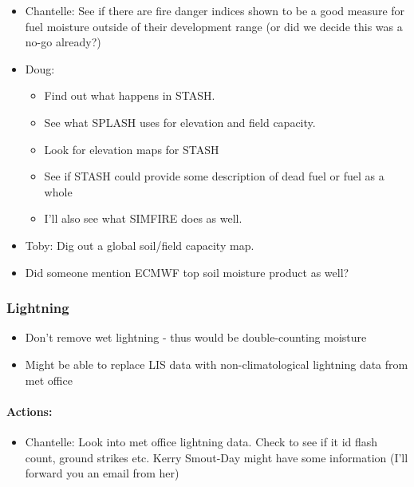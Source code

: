 \begin{itemize}
\itemsep1pt\parskip0pt
\item
  Chantelle: See if there are fire danger indices shown to be a good measure for fuel moisture outside of their development range (or did we decide this was a no-go already?)
\item
  Doug:

\begin{itemize}
\itemsep1pt\parskip0pt
\item
  Find out what happens in STASH.
\item
  See what SPLASH uses for elevation and field capacity.
\item
  Look for elevation maps for STASH
\item
  See if STASH could provide some description of dead fuel or fuel as a whole
\item
  I'll also see what SIMFIRE does as well.
\end{itemize}

\end{itemize}



\begin{itemize}
\itemsep1pt\parskip0pt
\item
  Toby: Dig out a global soil/field capacity map.
\item
  Did someone mention ECMWF top soil moisture product as well?
\end{itemize}

\subsubsection{Lightning}

\begin{itemize}
\itemsep1pt\parskip0pt
\item
  Don't remove wet lightning - thus would be double-counting moisture
\item
  Might be able to replace LIS data with non-climatological lightning data from met office
\end{itemize}

\paragraph{Actions:}

\begin{itemize}
\itemsep1pt\parskip0pt
\item
  Chantelle: Look into met office lightning data. Check to see if it id flash count, ground strikes etc. Kerry Smout-Day might have some information (I'll forward you an email from her)
\end{itemize}

